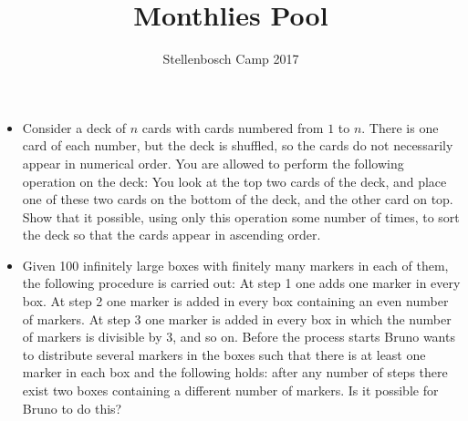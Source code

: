\documentclass[12pt]{article}
\title{Monthlies Pool}
\author{Stellenbosch Camp 2017}
\begin{document}
 \maketitle

\begin{itemize}

\item %

Consider a deck of $n$ cards with cards numbered from $1$ to $n$. There is one card of each number, but the deck is shuffled, so the cards do not necessarily appear in numerical order. You are allowed to perform the following operation on the deck: You look at the top two cards of the deck, and place one of these two cards on the bottom of the deck, and the other card on top. Show that it possible, using only this operation some number of times, to sort the deck so that the cards appear in ascending order. 


\item %
Given 100 infinitely large boxes with finitely many markers in each of them, the following procedure is carried out: At step 1 one adds one marker in every box. At step 2 one marker is added in every box containing an even number of markers. At step 3 one marker is added in every box in which the number of markers is divisible by 3, and so on. Before the process starts Bruno wants to distribute several markers in the boxes such that there is at least one marker in each box and the following holds: after any number of steps there exist two boxes containing a different number of markers. Is it possible for Bruno to do this?


\end{itemize}

\vfill

\centering
\begin{BVerbatim}
\end{BVerbatim}
\end{document}
